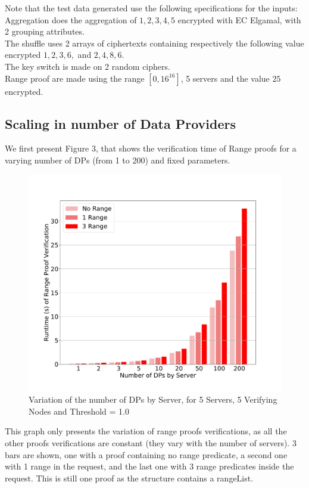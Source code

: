 \documentclass{article}
\begin{document}
Note that the test data generated use the following specifications for the inputs:\\
Aggregation does the aggregation of $1,2,3,4,5$ encrypted with EC Elgamal, with 2 grouping attributes.\\
The shuffle uses 2 arrays of ciphertexts containing respectively the following value encrypted $1,2,3,6,$ and $2,4,8,6$. \\
The key switch is made on 2 random ciphers.\\
Range proof are made using the range $[0,16^{16}]$, 5 servers and the value $25$ encrypted.
\subsection{Scaling in number of Data Providers}
We first present Figure 3, that shows the verification time of Range proofs for a varying number of DPs (from 1 to 200) and fixed parameters.
\begin{figure}[H]
\includegraphics[scale=0.5]{variationInDPRange}
\caption{Variation of the number of DPs by Server, for 5 Servers, 5 Verifying Nodes and Threshold = 1.0}
\end{figure}
This graph only presents the variation of range proofs verifications, as all the other proofs verifications are constant (they vary with the number of servers). 3 bars are shown, one with a proof containing no range predicate, a second one with 1 range in the request, and the last one with 3 range predicates inside the request. This is still one proof as the structure contains a rangeList.\\
\end{document}
